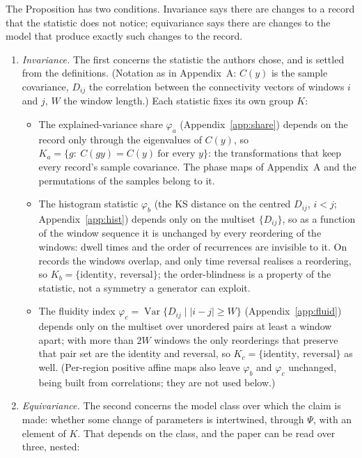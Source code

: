 \documentclass[11pt]{article}
\begin{document}
The Proposition has two conditions. Invariance says there are changes to a record that the statistic does not notice; equivariance says there are changes to the model that produce exactly such changes to the record.
\begin{enumerate}
\item[(i)] \emph{Invariance.} The first concerns the statistic the authors chose, and is settled from the definitions. (Notation as in Appendix~A: $C(y)$ is the sample covariance, $D_{ij}$ the correlation between the connectivity vectors of windows $i$ and $j$, $W$ the window length.) Each statistic fixes its own group $K$:
  \begin{itemize}
  \item[(a)] The explained-variance share $\varphi_a$ (Appendix~\ref{app:share}) depends on the record only through the eigenvalues of $C(y)$, so
  $K_a=\{g:\ C(gy)=C(y)\ \text{for every } y\}$: the transformations that keep every record's sample covariance. The phase maps of Appendix~A and the permutations of the samples belong to it.
  \item[(b)] The histogram statistic $\varphi_b$ (the KS distance on the centred $D_{ij}$, $i<j$; Appendix~\ref{app:hist}) depends only on the multiset $\{D_{ij}\}$, so as a function of the window sequence it is unchanged by every reordering of the windows: dwell times and the order of recurrences are invisible to it. On records the windows overlap, and only time reversal realises a reordering, so $K_b=\{\text{identity},\ \text{reversal}\}$; the order-blindness is a property of the statistic, not a symmetry a generator can exploit.
  \item[(c)] The fluidity index $\varphi_c=\operatorname{Var}\{D_{ij}\mid |i-j|\ge W\}$ (Appendix~\ref{app:fluid}) depends only on the multiset over unordered pairs at least a window apart; with more than $2W$ windows the only reorderings that preserve that pair set are the identity and reversal, so $K_c=\{\text{identity},\ \text{reversal}\}$ as well. (Per-region positive affine maps also leave $\varphi_b$ and $\varphi_c$ unchanged, being built from correlations; they are not used below.)
  \end{itemize}
\item[(ii)] \emph{Equivariance.} The second concerns the model class over which the claim is made: whether some change of parameters is intertwined, through $\Psi$, with an element of $K$. That depends on the class, and the paper can be read over three, nested:
  \begin{itemize}

\end{itemize}
\end{enumerate}
\end{document}
